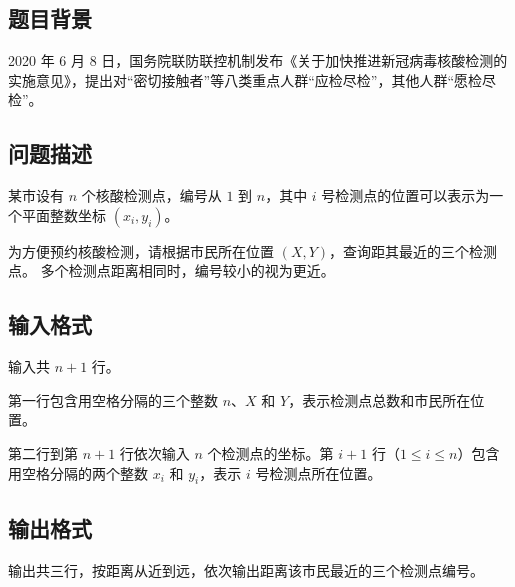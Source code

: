 \subsection*{题目背景}

2020 年 6 月 8 日，国务院联防联控机制发布《关于加快推进新冠病毒核酸检测的实施意见》，提出对“密切接触者”等八类重点人群“应检尽检”，其他人群“愿检尽检”。


\subsection*{问题描述}

某市设有 $n$ 个核酸检测点，编号从 $1$ 到 $n$，其中 $i$ 号检测点的位置可以表示为一个平面整数坐标 $(x_i, y_i)$。

为方便预约核酸检测，请根据市民所在位置 $(X, Y)$，查询距其最近的三个检测点。
多个检测点距离相同时，编号较小的视为更近。


\subsection*{输入格式}

输入共 $n+1$ 行。

第一行包含用空格分隔的三个整数 $n$、$X$ 和 $Y$，表示检测点总数和市民所在位置。

第二行到第 $n+1$ 行依次输入 $n$ 个检测点的坐标。第 $i+1$ 行（$1 \le i \le n$）包含用空格分隔的两个整数 $x_i$ 和 $y_i$，表示 $i$ 号检测点所在位置。


\subsection*{输出格式}

输出共三行，按距离从近到远，依次输出距离该市民最近的三个检测点编号。


